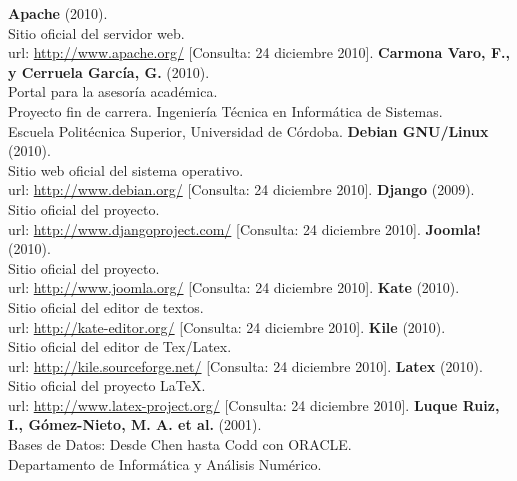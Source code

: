 \begin{thebibliography}{xx}

 \textbf{Apache} (2010).\\
        Sitio oficial del servidor web.\\
        url: \url{http://www.apache.org/}
        [Consulta: 24 diciembre 2010].
 \textbf{Carmona Varo, F., y Cerruela García, G.} (2010).\\
         Portal para la asesoría académica.\\
         Proyecto fin de carrera. Ingeniería Técnica en Informática de Sistemas.\\
         Escuela Politécnica Superior, Universidad de Córdoba.
 \textbf{Debian GNU/Linux} (2010).\\
         Sitio web oficial del sistema operativo.\\
         url: \url{http://www.debian.org/}
         [Consulta: 24 diciembre 2010].
 \textbf{Django} (2009).\\
         Sitio oficial del proyecto.\\
         url: \url{http://www.djangoproject.com/}
         [Consulta: 24 diciembre 2010].
 \textbf{Joomla!} (2010).\\
         Sitio oficial del proyecto.\\
         url: \url{http://www.joomla.org/}
         [Consulta: 24 diciembre 2010].
 \textbf{Kate} (2010).\\
         Sitio oficial del editor de textos.\\
         url: \url{http://kate-editor.org/}
         [Consulta: 24 diciembre 2010].
 \textbf{Kile} (2010).\\
         Sitio oficial del editor de Tex/Latex.\\
         url: \url{http://kile.sourceforge.net/}
         [Consulta: 24 diciembre 2010].
 \textbf{Latex} (2010).\\
         Sitio oficial del proyecto \LaTeX.\\
         url: \url{http://www.latex-project.org/}
         [Consulta: 24 diciembre 2010].
 \textbf{Luque Ruiz, I., Gómez-Nieto, M. A. et al.} (2001).\\
         Bases de Datos: Desde Chen hasta Codd con ORACLE.\\
         Departamento de Informática y Análisis Numérico.\\

\end{thebibliography}
